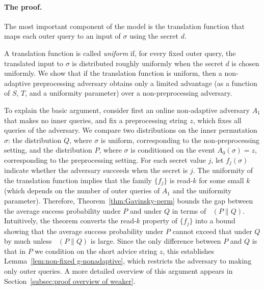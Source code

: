 \documentclass[11pt]{article}
\DeclareMathOperator{\KL}{D_{\text{KL}}}
\newcommand{\secv}{{d}}
\begin{document}

\paragraph{The proof.}
The most important component of the model is the translation function that maps each outer query to an input of $\sigma$ using the secret $\secv$.

A translation function is called \emph{uniform} if, for every fixed outer query, the translated input to $\sigma$ is distributed roughly uniformly when the secret $\secv$ is chosen uniformly. We show that if the translation function is uniform, then a non-adaptive preprocessing adversary obtains only a limited advantage (as a function of $S$, $T$, and a uniformity parameter) over a non-preprocessing adversary.

To explain the basic argument, consider first an online non-adaptive adversary $A_1$ that makes no inner queries, and fix a preprocessing string $z$, which fixes all queries of the adversary. We compare two distributions on the inner permutation $\sigma$: the distribution $Q$, where $\sigma$ is uniform, corresponding to the non-preprocessing setting, and the distribution $P$, where $\sigma$ is conditioned on the event $A_0(\sigma)=z$, corresponding to the preprocessing setting. For each secret value $j$, let $f_j(\sigma)$ indicate whether the adversary succeeds when the secret is $j$. The uniformity of the translation function implies that the family $\{f_j\}$ is read-$k$ for some small $k$ (which depends on the number of outer queries of $A_1$ and the uniformity parameter). Therefore, Theorem~\ref{thm:Gavinsky-perm} bounds the gap between the average success probability under $P$ and under $Q$ in terms of $\KL(P\|Q)$. Intuitively, the theorem converts the read-$k$ property of $\{f_j\}$ into a bound showing that the average success probability under $P$ cannot exceed that under $Q$ by much unless $\KL(P\|Q)$ is large. Since the only difference between $P$ and $Q$ is that in $P$ we condition on the short advice string $z$, this  establishes Lemma~\ref{lem:non-fixed g-nonadaptive}, which restricts the adversary to making only outer queries. A more detailed overview of this argument appears in Section~\ref{subsec:proof overview of weaker}.
\end{document}
